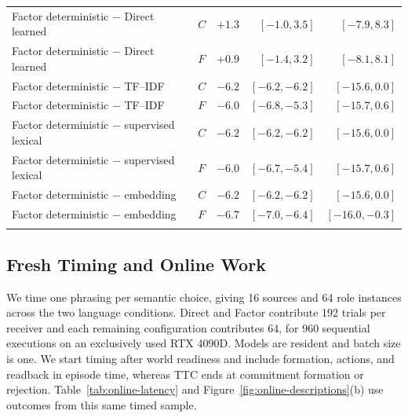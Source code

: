 \documentclass[sigconf,nonacm,balance=false]{aamas}
\begin{document}
\begin{table}[!htbp]
\begin{tabular}{@{}llrrr@{}}
Factor deterministic $-$ Direct learned & $C$ & $+1.3$ & $[-1.0,3.5]$ & $[-7.9,8.3]$\\
Factor deterministic $-$ Direct learned & $F$ & $+0.9$ & $[-1.4,3.2]$ & $[-8.1,8.1]$\\
Factor deterministic $-$ TF--IDF & $C$ & $-6.2$ & $[-6.2,-6.2]$ & $[-15.6,0.0]$\\
Factor deterministic $-$ TF--IDF & $F$ & $-6.0$ & $[-6.8,-5.3]$ & $[-15.7,0.6]$\\
Factor deterministic $-$ supervised lexical & $C$ & $-6.2$ & $[-6.2,-6.2]$ & $[-15.6,0.0]$\\
Factor deterministic $-$ supervised lexical & $F$ & $-6.0$ & $[-6.7,-5.4]$ & $[-15.7,0.6]$\\
Factor deterministic $-$ embedding & $C$ & $-6.2$ & $[-6.2,-6.2]$ & $[-15.6,0.0]$\\
Factor deterministic $-$ embedding & $F$ & $-6.7$ & $[-7.0,-6.4]$ & $[-16.0,-0.3]$\\
\addlinespace
\bottomrule\end{tabular}\end{table}

\subsection{Fresh Timing and Online Work}

We time one phrasing per semantic choice, giving 16 sources and 64 role instances across the two language conditions. Direct and Factor contribute 192 trials per receiver and each remaining configuration contributes 64, for 960 sequential executions on an exclusively used RTX 4090D. Models are resident and batch size is one. We start timing after world readiness and include formation, actions, and readback in episode time, whereas TTC ends at commitment formation or rejection. Table~\ref{tab:online-latency} and Figure~\ref{fig:online-descriptions}(b) use outcomes from this same timed sample.
\end{document}
